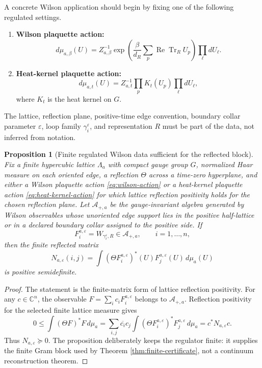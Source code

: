 \documentclass[11pt]{article}
\newtheorem{proposition}[theorem]{Proposition}
\newcommand{\C}{\mathbb C}
\newcommand{\eps}{\varepsilon}
\newcommand{\Tr}{\operatorname{Tr}}
\newcommand{\Ree}{\operatorname{Re}}
\begin{document}
A concrete Wilson application should begin by fixing one of the following regulated settings.
\begin{enumerate}[label=(R\arabic*)]
  \item \textbf{Wilson plaquette action:}
  \begin{equation}
    d\mu_{a,\beta}(U)
    =Z^{-1}_{a,\beta}\exp\!\left(\frac{\beta}{d_R}\sum_p \Ree\Tr_R U_p\right)
    \prod_{\ell}dU_\ell.
    \label{eq:wilson-action}
  \end{equation}
  \item \textbf{Heat-kernel plaquette action:}
  \begin{equation}
    d\mu_{a,t}(U)
    =Z^{-1}_{a,t}\prod_p K_t(U_p)\prod_{\ell}dU_\ell,
    \label{eq:heat-kernel-action}
  \end{equation}
  where \(K_t\) is the heat kernel on \(G\).
\end{enumerate}
The lattice, reflection plane, positive-time edge convention, boundary collar parameter \(\eps\), loop family \(\gamma_i^\eps\), and representation \(R\) must be part of the data, not inferred from notation.

\begin{proposition}[Finite regulated Wilson data sufficient for the reflected block]
\label{prop:regulator-observable-data}
Fix a finite hypercubic lattice \(\Lambda_a\) with compact gauge group \(G\), normalized Haar measure on each oriented edge, a reflection \(\Theta\) across a time-zero hyperplane, and either a Wilson plaquette action \eqref{eq:wilson-action} or a heat-kernel plaquette action \eqref{eq:heat-kernel-action} for which lattice reflection positivity holds for the chosen reflection plane.  Let \(\mathcal A_{+,a}\) be the gauge-invariant algebra generated by Wilson observables whose unoriented edge support lies in the positive half-lattice or in a declared boundary collar assigned to the positive side.  If
\[
  F_i^{a,\eps}=W_{\gamma_i^\eps,R}\in\mathcal A_{+,a},
  \qquad i=1,\ldots,n,
\]
then the finite reflected matrix
\[
  N_{a,\eps}(i,j)
  =
  \int(\Theta F_i^{a,\eps})^*(U)F_j^{a,\eps}(U)\,d\mu_a(U)
\]
is positive semidefinite.
\end{proposition}

\begin{proof}
The statement is the finite-matrix form of lattice reflection positivity.  For any \(c\in\C^n\), the observable \(F=\sum_i c_iF_i^{a,\eps}\) belongs to \(\mathcal A_{+,a}\).  Reflection positivity for the selected finite lattice measure gives
\[
  0\le \int(\Theta F)^*F\,d\mu_a
  =
  \sum_{i,j}\overline{c_i}c_j
  \int(\Theta F_i^{a,\eps})^*F_j^{a,\eps}\,d\mu_a
  =
  c^*N_{a,\eps}c .
\]
Thus \(N_{a,\eps}\succeq0\).  The proposition deliberately keeps the regulator finite: it supplies the finite Gram block used by Theorem \ref{thm:finite-certificate}, not a continuum reconstruction theorem.
\end{proof}
\end{document}
